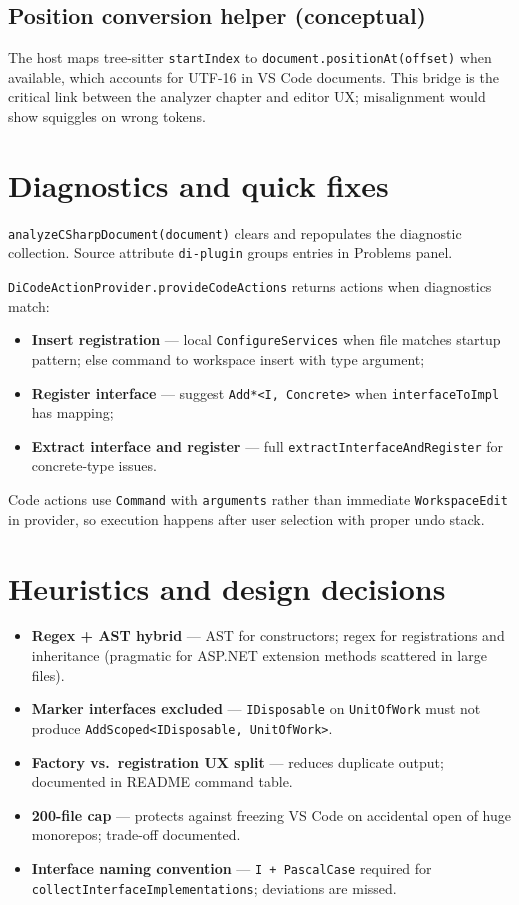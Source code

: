 \subsection{Position conversion helper (conceptual)}

The host maps tree-sitter \texttt{startIndex} to \texttt{document.positionAt(offset)} when available, which accounts for UTF-16 in VS Code documents. This bridge is the critical link between the analyzer chapter and editor UX; misalignment would show squiggles on wrong tokens.

\section{Diagnostics and quick fixes}
\label{chap4:diagnostics}

\texttt{analyzeCSharpDocument(document)} clears and repopulates the diagnostic collection. Source attribute \texttt{di-plugin} groups entries in Problems panel.

\texttt{DiCodeActionProvider.provideCodeActions} returns actions when diagnostics match:
\begin{itemize}
	\item \textbf{Insert registration} --- local \texttt{ConfigureServices} when file matches startup pattern; else command to workspace insert with type argument;
	\item \textbf{Register interface} --- suggest \texttt{Add*<I, Concrete>} when \texttt{interfaceToImpl} has mapping;
	\item \textbf{Extract interface and register} --- full \texttt{extractInterfaceAndRegister} for concrete-type issues.
\end{itemize}

Code actions use \texttt{Command} with \texttt{arguments} rather than immediate \texttt{WorkspaceEdit} in provider, so execution happens after user selection with proper undo stack.

\section{Heuristics and design decisions}
\label{chap4:heuristics}

\begin{itemize}
	\item \textbf{Regex + AST hybrid} --- AST for constructors; regex for registrations and inheritance (pragmatic for ASP.NET extension methods scattered in large files).
	\item \textbf{Marker interfaces excluded} --- \texttt{IDisposable} on \texttt{UnitOfWork} must not produce \texttt{AddScoped<IDisposable, UnitOfWork>}.
	\item \textbf{Factory vs.\ registration UX split} --- reduces duplicate output; documented in README command table.
	\item \textbf{200-file cap} --- protects against freezing VS Code on accidental open of huge monorepos; trade-off documented.
	\item \textbf{Interface naming convention} --- \texttt{I + PascalCase} required for \texttt{collectInterfaceImplementations}; deviations are missed.
\end{itemize}

